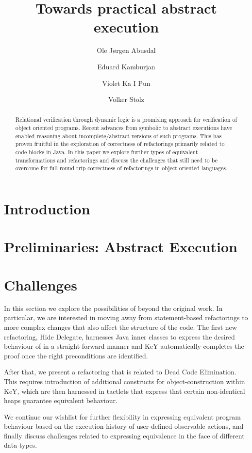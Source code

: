 \documentclass[runningheads]{llncs}
\title{Towards practical abstract execution}
\author{Ole J{\o}rgen Abusdal\inst{1} \and Eduard Kamburjan\inst{2} \and Violet Ka I Pun\inst{1} \and Volker Stolz\inst{1}}
\institute{%
Western Norway University of Applied Sciences, Norway\\
\email{\{ojab,vpu,vsto\}@hvl.no}
\and University of Oslo, Norway\\
\email{eduard@ifi.uio.no}
}
\begin{document}
\maketitle

\begin{abstract}
Relational verification through dynamic logic is a promising approach for verification of object oriented programs.
Recent advances from symbolic to abstract executions have enabled reasoning about incomplete/abstract versions of such programs.
This has proven fruitful in the exploration of correctness of refactorings primarily related to code blocks in Java.
In this paper we explore further types of equivalent transformations and refactorings and discuss the challenges that still
need to be overcome for full round-trip correctness of refactorings in object-oriented languages.
\end{abstract}

\section{Introduction}


\section{Preliminaries: Abstract Execution}\label{sec:prelim}




\section{Challenges}\label{sec:challenges}
In this section we explore the possibilities of \Refinity{} beyond the original work.
In particular, we are interested in moving away from statement-based refactorings to more complex changes that also affect the structure of the code.
The first new refactoring, Hide Delegate, harnesses Java inner classes to express the desired behaviour of \Refinity{} in a straight-forward manner
and KeY automatically completes the proof once the right preconditions are identified.

After that, we present a refactoring that is related to Dead Code Elimination.
This requires introduction of additional constructs for object-construction within KeY,
which are then harnessed in tactlets that express that certain non-identical heaps guarantee equivalent behaviour.

We continue our wishlist for further flexibility in expressing equivalent program behaviour based on the execution history of user-defined observable actions,
and finally discuss challenges related to expressing equivalence in the face of different data types.
\end{document}

